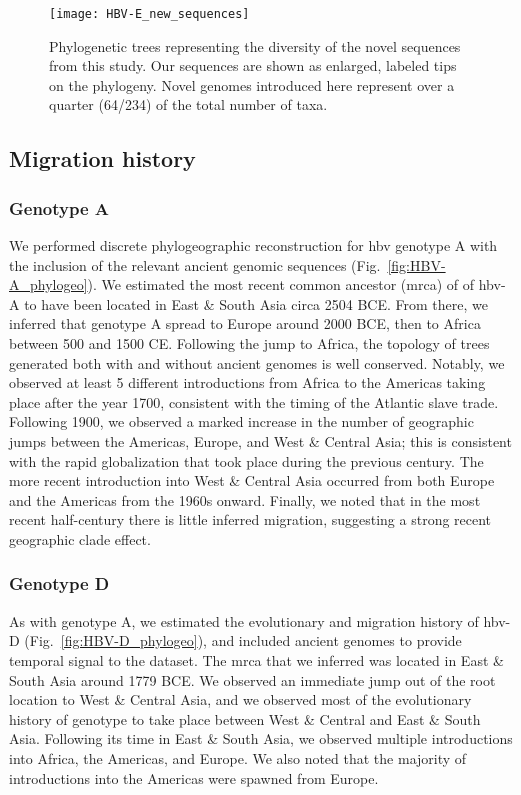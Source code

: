 \begin{figure}[ht]
  \centering
  \medskip
  \texttt{[image: HBV-E\_new\_sequences]}
  \caption[HBV-E New sequences]{Phylogenetic trees representing the diversity of the novel sequences from this study. Our sequences are shown as enlarged, labeled tips on the phylogeny. Novel genomes introduced here represent over a quarter (64/234) of the total number of taxa.}
  \label{fig:HBV-E_new_sequences}
\end{figure}

\subsection{Migration history}

\subsubsection{Genotype A}

We performed discrete phylogeographic reconstruction for \gls{hbv} genotype A with the inclusion of the relevant ancient genomic sequences (Fig.~\ref{fig:HBV-A_phylogeo}).
We estimated the most recent common ancestor (\gls{mrca}) of of \gls{hbv}-A to have been located in East \& South Asia circa 2504 BCE.
From there, we inferred that genotype A spread to Europe around 2000 BCE, then to Africa between 500 and 1500 CE.
Following the jump to Africa, the topology of trees generated both with and without ancient genomes is well conserved.
Notably, we observed at least 5 different introductions from Africa to the Americas taking place after the year 1700, consistent with the timing of the Atlantic slave trade.
Following 1900, we observed a marked increase in the number of geographic jumps between the Americas, Europe, and West \& Central Asia; this is consistent with the rapid globalization that took place during the previous century.
The more recent introduction into West \& Central Asia occurred from both Europe and the Americas from the 1960s onward.
Finally, we noted that in the most recent half-century there is little inferred migration, suggesting a strong recent geographic clade effect.

\subsubsection{Genotype D}

As with genotype A, we estimated the evolutionary and migration history of \gls{hbv}-D (Fig.~\ref{fig:HBV-D_phylogeo}), and included ancient genomes to provide temporal signal to the dataset.
The \gls{mrca} that we inferred was located in East \& South Asia around 1779 BCE.
We observed an immediate jump out of the root location to West \& Central Asia, and we observed most of the evolutionary history of genotype to take place between West \& Central and East \& South Asia.
Following its time in East \& South Asia, we observed multiple introductions into Africa, the Americas, and Europe.
We also noted that the majority of introductions into the Americas were spawned from Europe.

